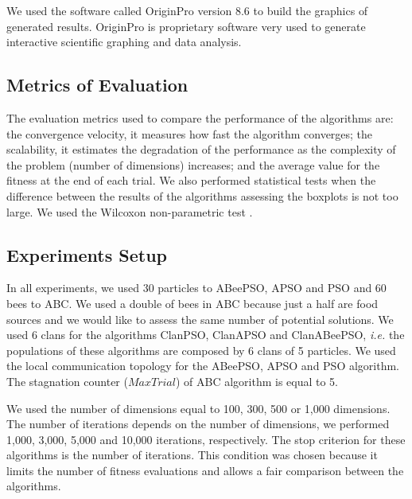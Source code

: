 We used the software called OriginPro version 8.6 to build the graphics \cite{DOSS:Origin2011} of generated results. OriginPro is proprietary software very used to generate interactive scientific graphing and data analysis.

\subsection{Metrics of Evaluation}
The evaluation metrics used to compare the performance of the algorithms are: the convergence velocity, it measures how fast the algorithm converges; the scalability, it estimates the degradation of the performance as the complexity of the problem (number of dimensions) increases; and the average value for the fitness at the end of each trial.
We also performed statistical tests when the difference between the results of the algorithms assessing the boxplots is not too large. We used the Wilcoxon non-parametric test \cite{Wil:Lowry2011}. %


\subsection{Experiments Setup}
In all experiments, we used 30 particles to ABeePSO, APSO and PSO and 60 bees to ABC. We used a double of bees in ABC because just a half are food sources and we would like to assess the same number of potential solutions. We used 6 clans for the algorithms ClanPSO, ClanAPSO and ClanABeePSO, \textit{i.e.} the populations of these algorithms are composed by 6 clans of 5 particles. We used the local communication topology for the ABeePSO, APSO and PSO algorithm. The stagnation counter ($MaxTrial$) of ABC algorithm is equal to 5.

We used the number of dimensions equal to 100, 300, 500 or 1,000 dimensions. The number of iterations depends on the number of dimensions, we performed 1,000, 3,000, 5,000 and 10,000 iterations, respectively. The stop criterion for these algorithms is the number of iterations. This condition was chosen because it limits the number of fitness evaluations and allows a fair comparison between the algorithms.

